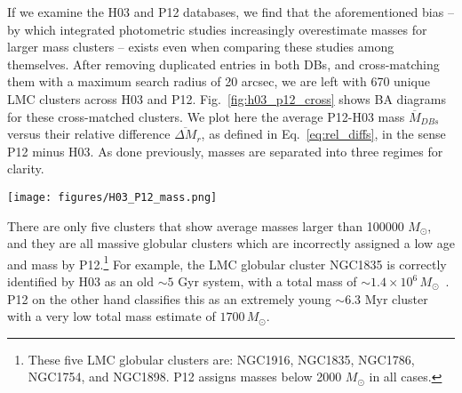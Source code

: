 \documentclass{aa}
\begin{document}
If we examine the H03 and P12 databases, we find that the aforementioned bias
-- by which integrated photometric studies increasingly overestimate masses for
larger mass clusters -- exists even when comparing these studies among themselves.
%
After removing duplicated entries in both DBs, and cross-matching them with
a maximum search radius of 20 arcsec, we are left with 670 unique LMC clusters
across H03 and P12.
Fig.~\ref{fig:h03_p12_cross} shows BA diagrams for these cross-matched clusters.
We plot here the average P12-H03 mass $\overline{M}_{DBs}$
versus their relative difference $\overline{\Delta M}_r$, as defined in
Eq.~\ref{eq:rel_diffs}, in the sense P12 minus H03. As done previously, masses
are separated into three regimes for clarity.
%
\begin{figure*}
\texttt{[image: figures/H03\_P12\_mass.png]}
\caption{\emph{Left}: BA plot for the relative difference between P12 minus H03
masses, for average mass values below 5000 $M_{\odot}$. Clusters are colored
according to the difference in their assigned logarithmic ages by each DB --
i.e.: $\Delta \log(age/yr)$ -- in the sense P12 minus H03; see colorbar in the
rightmost plot. The mean and standard deviation for $\overline{\Delta M}_r$ is
shown as a dashed black line and a gray region, respectively.
\emph{Center}: idem, for average DB masses
$5000<\overline{M}_{DB}<20000\,(M_{\odot})$.
\emph{Right}: idem, for average DB masses
$\overline{M}_{DB}>20000\,(M_{\odot})$.}
\label{fig:h03_p12_cross}
\end{figure*}
%
There are only five clusters that show average masses larger than 100000
$M_{\odot}$, and they are all massive globular clusters which are incorrectly
assigned a low age and mass by P12.\footnote{These five LMC globular clusters
are: NGC1916, NGC1835, NGC1786, NGC1754, and NGC1898. P12 assigns masses
below 2000 $M_{\odot}$ in all cases.}
For example, the LMC globular cluster NGC1835 is correctly identified by H03 as
an old ${\sim}5$ Gyr system, with a total mass of
$\sim1.4{\times}10^6\,M_{\odot}$~\citep[a reasonable value,
although a bit overestimated, according to][]{Dubath_1990}. P12 on the
other hand classifies this as an extremely young
${\sim}6.3$ Myr cluster with a very low total mass estimate of $1700\,M_{\odot}$.
\end{document}
